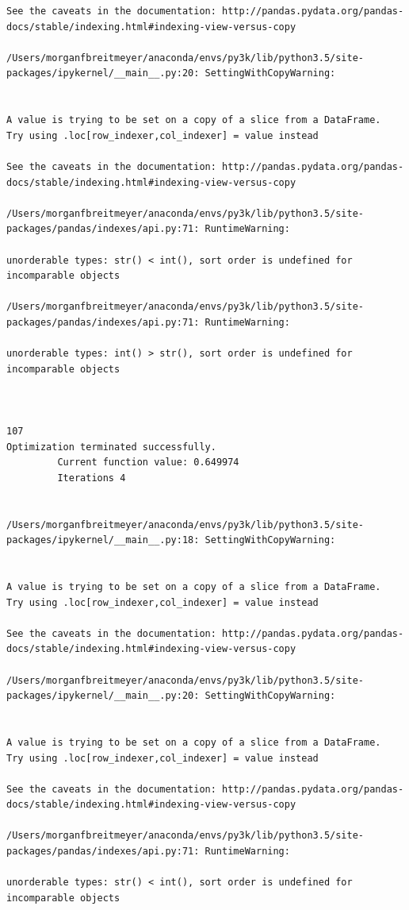 \begin{lstlisting}
See the caveats in the documentation: http://pandas.pydata.org/pandas-docs/stable/indexing.html#indexing-view-versus-copy

/Users/morganfbreitmeyer/anaconda/envs/py3k/lib/python3.5/site-packages/ipykernel/__main__.py:20: SettingWithCopyWarning:


A value is trying to be set on a copy of a slice from a DataFrame.
Try using .loc[row_indexer,col_indexer] = value instead

See the caveats in the documentation: http://pandas.pydata.org/pandas-docs/stable/indexing.html#indexing-view-versus-copy

/Users/morganfbreitmeyer/anaconda/envs/py3k/lib/python3.5/site-packages/pandas/indexes/api.py:71: RuntimeWarning:

unorderable types: str() < int(), sort order is undefined for incomparable objects

/Users/morganfbreitmeyer/anaconda/envs/py3k/lib/python3.5/site-packages/pandas/indexes/api.py:71: RuntimeWarning:

unorderable types: int() > str(), sort order is undefined for incomparable objects



107
Optimization terminated successfully.
         Current function value: 0.649974
         Iterations 4


/Users/morganfbreitmeyer/anaconda/envs/py3k/lib/python3.5/site-packages/ipykernel/__main__.py:18: SettingWithCopyWarning:


A value is trying to be set on a copy of a slice from a DataFrame.
Try using .loc[row_indexer,col_indexer] = value instead

See the caveats in the documentation: http://pandas.pydata.org/pandas-docs/stable/indexing.html#indexing-view-versus-copy

/Users/morganfbreitmeyer/anaconda/envs/py3k/lib/python3.5/site-packages/ipykernel/__main__.py:20: SettingWithCopyWarning:


A value is trying to be set on a copy of a slice from a DataFrame.
Try using .loc[row_indexer,col_indexer] = value instead

See the caveats in the documentation: http://pandas.pydata.org/pandas-docs/stable/indexing.html#indexing-view-versus-copy

/Users/morganfbreitmeyer/anaconda/envs/py3k/lib/python3.5/site-packages/pandas/indexes/api.py:71: RuntimeWarning:

unorderable types: str() < int(), sort order is undefined for incomparable objects


\end{lstlisting}
